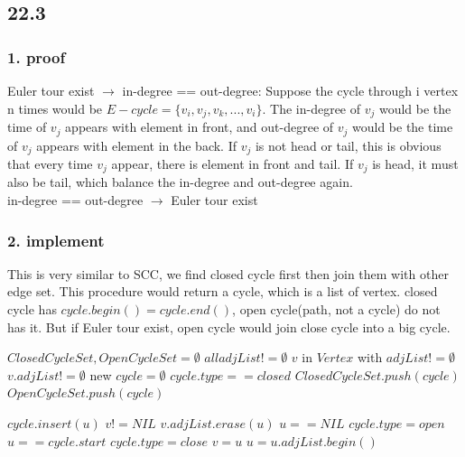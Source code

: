 \documentclass[]{article}
\begin{document}
\subsection{22.3}

\subsubsection{1. proof}

Euler tour exist $\rightarrow$ in-degree == out-degree: Suppose the cycle through i vertex n times would be $E-cycle = \{ v_{i}, v_{j}, v_{k}, ... , v_{i} \}$. The in-degree of $v_{j}$ would be the time of  $v_{j}$ appears with element in front, and out-degree of $v_{j}$ would be the time of $v_{j}$ appears with element in the back. If $v_{j}$ is not head or tail, this is obvious that every time $v_{j}$ appear, there is element in front and tail. If $v_{j}$ is head, it must also be tail, which balance the in-degree and out-degree again.\\

in-degree == out-degree $\rightarrow$ Euler tour exist

\subsubsection{2. implement}

This is very similar to SCC, we find closed cycle first then join them with other edge set. This procedure would return a cycle, which is a list of vertex. closed cycle has $cycle.begin() = cycle.end()$, open cycle(path, not a cycle) do not has it. But if Euler tour exist, open cycle would join close cycle into a big cycle.

\begin{codebox}
	
	\li $ClosedCycleSet, OpenCycleSet = \emptyset$
	\li \While $all adjList != \emptyset$ \Do
	\li \For $v$ in $Vertex$ with $adjList != \emptyset$\Do
	\li \If $v.adjList != \emptyset$ \Then
	\li new $cycle = \emptyset$
	\li {}
	\li \If $cycle.type == closed$
	\li \Then $ClosedCycleSet.push(cycle)$
	\li \Else $OpenCycleSet.push(cycle)$
	
\end{codebox}

\begin{codebox}
	
	\li $cycle.insert(u)$
	\li \If $v != NIL$ 
	\li \Then $v.adjList.erase(u)$ \End
	\li \If $u == NIL$ 
	\li \Then $cycle.type = open$
	\li \Return  
	\li \ElseIf $u == cycle.start$ 
	\li \Then $cycle.type = close$
	\li \Return 
	\li \Else $v = u$
	\li $u = u.adjList.begin()$
	\li {}
	\End
	\End
	
\end{codebox}
\end{document}
